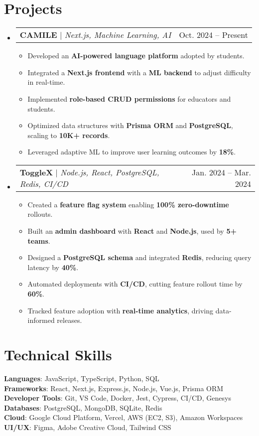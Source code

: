 \documentclass[letterpaper,11pt]{article}
\makeatletter
\newcommand{\resumeItem}[1]{
  \item\small{
    {#1 \vspace{-2pt}}
  }
}
\newcommand{\resumeProjectHeading}[2]{
    \item
    \begin{tabular*}{0.97\textwidth}{l@{\extracolsep{\fill}}r}
      \small#1 & #2 \\
    \end{tabular*}\vspace{-7pt}
}
\newcommand{\resumeItemListStart}{\begin{itemize}}
\newcommand{\resumeItemListEnd}{\end{itemize}\vspace{-5pt}}
\makeatother
\begin{document}
\section{Projects}
  \begin{itemize}[leftmargin=0.15in, label={}]
\resumeProjectHeading
  {\textbf{CAMILE} $|$ \emph{Next.js, Machine Learning, AI}}{Oct. 2024 -- Present}
  \resumeItemListStart
    \resumeItem{Developed an \textbf{AI-powered language platform} adopted by students.}
    \resumeItem{Integrated a \textbf{Next.js frontend} with a \textbf{ML backend} to adjust difficulty in real-time.}
    \resumeItem{Implemented \textbf{role-based CRUD permissions} for educators and students.}
    \resumeItem{Optimized data structures with \textbf{Prisma ORM} and \textbf{PostgreSQL}, scaling to \textbf{10K+ records}.}
    \resumeItem{Leveraged adaptive ML to improve user learning outcomes by \textbf{18\%}.}
  \resumeItemListEnd

   \resumeProjectHeading
  {\textbf{ToggleX} $|$ \emph{Node.js, React, PostgreSQL, Redis, CI/CD}}{Jan. 2024 -- Mar. 2024}
  \resumeItemListStart
    \resumeItem{Created a \textbf{feature flag system} enabling \textbf{100\% zero-downtime} rollouts.}
    \resumeItem{Built an \textbf{admin dashboard} with \textbf{React} and \textbf{Node.js}, used by \textbf{5+ teams}.}
    \resumeItem{Designed a \textbf{PostgreSQL schema} and integrated \textbf{Redis}, reducing query latency by \textbf{40\%}.}
    \resumeItem{Automated deployments with \textbf{CI/CD}, cutting feature rollout time by \textbf{60\%}.}
    \resumeItem{Tracked feature adoption with \textbf{real-time analytics}, driving data-informed releases.}
  \resumeItemListEnd
  \end{itemize}

\section{Technical Skills}
 \begin{itemize}[leftmargin=0.15in, label={}]
    \small{\item{
     \textbf{Languages}{: JavaScript, TypeScript, Python, SQL} \\
     \textbf{Frameworks}{: React, Next.js, Express.js, Node.js, Vue.js, Prisma ORM} \\
     \textbf{Developer Tools}{: Git, VS Code, Docker, Jest, Cypress, CI/CD, Genesys} \\
     \textbf{Databases}{: PostgreSQL, MongoDB, SQLite, Redis} \\
     \textbf{Cloud}{: Google Cloud Platform, Vercel, AWS (EC2, S3), Amazon Workspaces} \\
     \textbf{UI/UX}{: Figma, Adobe Creative Cloud, Tailwind CSS} \\
    }}
 \end{itemize}

\end{document}

